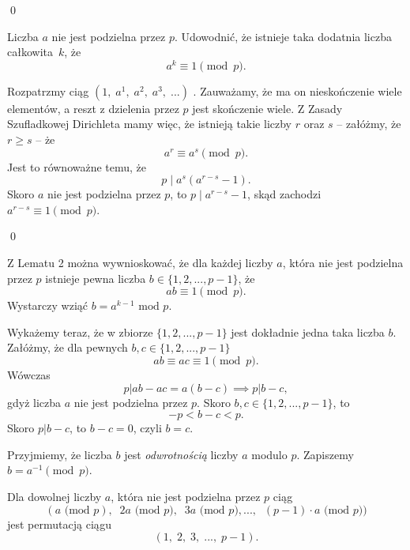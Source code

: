 \qed

\vspace{10px}


\noindent
Liczba $a$ nie jest podzielna przez $p$. Udowodnić, że istnieje taka dodatnia liczba całkowita~$k$, że 
\[
   a^k\equiv 1 \pmod{p}.
\]



\noindent
Rozpatrzmy ciąg $(1,\; a^1,\; a^2,\; a^3,\; ...)$ . Zauważamy, że ma on nieskończenie wiele elementów, a reszt z dzielenia przez $p$ jest skończenie wiele. Z Zasady Szufladkowej Dirichleta mamy więc, że istnieją takie liczby $r$ oraz $s$ -- załóżmy, że $r\geqslant s $ -- że 
\[
    a^r\equiv a^s \pmod{p}.
\]
Jest to równoważne temu, że 
\[  
    p\mid a^s(a^{r-s}-1).
\]
Skoro $a$ nie jest podzielna przez $p$, to $p\mid a^{r-s}-1$, skąd zachodzi $a^{r-s}\equiv 1 \pmod{p}$.

\qed


\vspace{10 px}

\noindent
Z Lematu 2 można wywnioskować, że dla każdej liczby $a$, która nie jest podzielna przez $p$ istnieje pewna liczba $b \in \{1, 2, ..., p-1\}$, że
\[
    ab \equiv 1 \pmod{p}.
\]
Wystarczy wziąć $b = a^{k - 1} \text{ mod } p$. 

\vspace{10px}
\noindent
Wykażemy teraz, że w zbiorze $\{1, 2, ..., p-1\}$ jest dokładnie jedna taka liczba $b$. Załóżmy, że dla pewnych $b, c \in \{1, 2, ..., p-1\}$
\[
    ab \equiv  ac \equiv 1 \pmod{p}.
\]
Wówczas
\[
    p \big| ab - ac = a(b - c) \implies p \big|b - c,
\]
gdyż liczba $a$ nie jest podzielna przez $p$. Skoro $b, c \in \{1, 2, ..., p-1\}$, to 
\[
    - p < b - c < p.
\]
Skoro $p \big| b - c$, to $b - c = 0$, czyli $b = c$.

\vspace{10px}

\noindent
Przyjmiemy, że liczba $b$ jest \textit{odwrotnością} liczby $a$ modulo $p$. Zapiszemy $b = a^{-1} \pmod{p}$.

\vspace{10px}


\noindent
Dla dowolnej liczby $a$, która nie jest podzielna przez $p$ ciąg
\[
    (a \text{ (mod } p),\;\; 2a \text{ (mod } p),\;\;  3a \text{ (mod } p), ...,\;\;  (p - 1) \cdot a \text{ (mod } p))
\]
jest permutacją ciągu
\[
 (1,\; 2,\; 3,\; ...,\; p - 1).
\]

